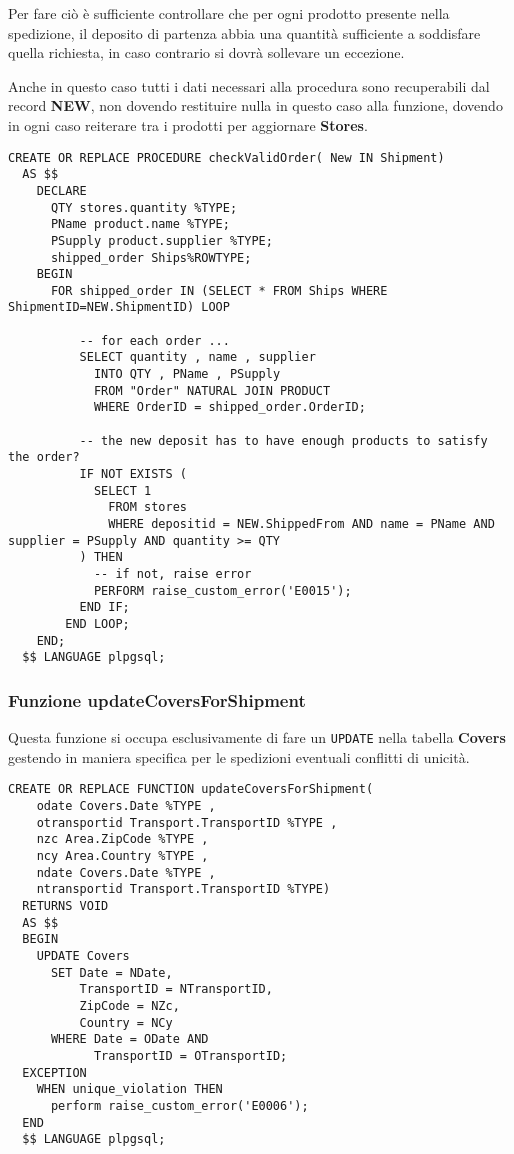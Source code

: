 Per fare ciò è sufficiente controllare che per ogni prodotto presente nella spedizione, il deposito di partenza abbia una quantità sufficiente a soddisfare quella richiesta, in caso contrario si dovrà sollevare un eccezione.

Anche in questo caso tutti i dati necessari alla procedura sono recuperabili dal record \textbf{NEW}, non dovendo restituire nulla in questo caso alla funzione, dovendo in ogni caso reiterare tra i prodotti per aggiornare \textbf{Stores}.

\begin{lstlisting}[caption={Procedure \textbf{checkValidOrder}}]
  CREATE OR REPLACE PROCEDURE checkValidOrder( New IN Shipment)
  AS $$
    DECLARE
      QTY stores.quantity %TYPE;
      PName product.name %TYPE;
      PSupply product.supplier %TYPE;
      shipped_order Ships%ROWTYPE;
    BEGIN
      FOR shipped_order IN (SELECT * FROM Ships WHERE ShipmentID=NEW.ShipmentID) LOOP
  
          -- for each order ...
          SELECT quantity , name , supplier 
            INTO QTY , PName , PSupply
            FROM "Order" NATURAL JOIN PRODUCT
            WHERE OrderID = shipped_order.OrderID;
  
          -- the new deposit has to have enough products to satisfy the order?
          IF NOT EXISTS (
            SELECT 1
              FROM stores
              WHERE depositid = NEW.ShippedFrom AND name = PName AND supplier = PSupply AND quantity >= QTY
          ) THEN
            -- if not, raise error
            PERFORM raise_custom_error('E0015');
          END IF;
        END LOOP;
    END;
  $$ LANGUAGE plpgsql;
\end{lstlisting}

\newpage

\subsubsection{Funzione \textbf{updateCoversForShipment}}

Questa funzione si occupa esclusivamente di fare un \lstinline{UPDATE} nella tabella \textbf{Covers} gestendo in maniera specifica per le spedizioni eventuali conflitti di unicità.

\begin{lstlisting}[caption={Funzione \textbf{updateCoversForShipment}}]
  CREATE OR REPLACE FUNCTION updateCoversForShipment(
    odate Covers.Date %TYPE , 
    otransportid Transport.TransportID %TYPE , 
    nzc Area.ZipCode %TYPE , 
    ncy Area.Country %TYPE , 
    ndate Covers.Date %TYPE , 
    ntransportid Transport.TransportID %TYPE)
  RETURNS VOID 
  AS $$
  BEGIN
    UPDATE Covers 
      SET Date = NDate,
          TransportID = NTransportID,
          ZipCode = NZc,
          Country = NCy
      WHERE Date = ODate AND 
            TransportID = OTransportID;
  EXCEPTION
    WHEN unique_violation THEN 
      perform raise_custom_error('E0006');
  END
  $$ LANGUAGE plpgsql;
\end{lstlisting}
